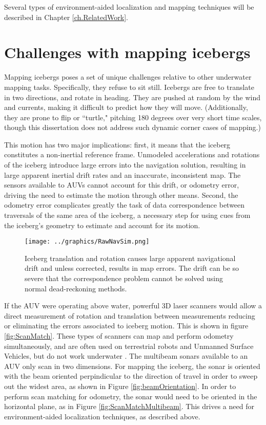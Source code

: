 Several types of environment-aided localization and mapping techniques will be described in Chapter \ref{ch.RelatedWork}.

\section{Challenges with mapping icebergs}

Mapping icebergs poses a set of unique challenges relative to other underwater mapping tasks. Specifically, they refuse to sit still. Icebergs are free to translate in two directions, and rotate in heading. They are pushed at random by the wind  and currents, making it difficult to predict how they will move. (Additionally, they are prone to flip or ``turtle," pitching 180 degrees over very short time scales, though this dissertation does not address such dynamic corner cases of mapping.) 

This motion has two major implications: first, it means that the iceberg constitutes a non-inertial reference frame. Unmodeled accelerations and rotations of the iceberg introduce large errors into the navigation solution, resulting in large apparent inertial drift rates and an inaccurate, inconsistent map. The sensors available to AUVs cannot account for this drift, or odometry error, driving the need to estimate the motion through other means. Second, the odometry error complicates greatly the task of data correspondence between traversals of the same area of the iceberg, a necessary step for using cues from the iceberg's geometry to estimate and account for its motion.

\begin{figure}[htbp]
   \centering
   \texttt{[image: ../graphics/RawNavSim.png]} %
   \caption{Iceberg translation and rotation causes large apparent navigational drift and unless corrected, results in map errors. The drift can be so severe that the correspondence problem cannot be solved using normal dead-reckoning methods.}
   \label{fig:naiveMapping}
\end{figure}

If the AUV were operating above water, powerful 3D laser scanners would allow a direct measurement of rotation and translation between measurements reducing or eliminating the errors associated to iceberg motion. This is shown in figure \ref{fig:ScanMatch}. These types of scanners can map and perform odometry simultaneously, and are often used on terrestrial robots and Unmanned Surface Vehicles, but do not work underwater \cite{ref:Singapore}. The multibeam sonars available to an AUV only scan in two dimensions. For mapping the iceberg, the sonar is oriented with the beam oriented perpindicular to the direction of travel in order to sweep out the widest area, as shown in Figure \ref{fig:beamOrientation}.  In order to perform scan matching for odometry, the sonar would need to be oriented in the horizontal plane, as in Figure \ref{fig:ScanMatchMultibeam}. This drives a need for environment-aided localization techniques, as described above. 

